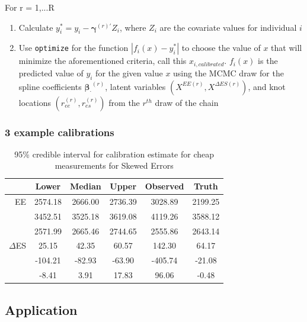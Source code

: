 \documentclass[handout]{beamer}\usepackage[]{graphicx}\usepackage[]{color}
\begin{document}
\begin{frame}

For r = 1,...R
\begin{enumerate}
\item
Calculate $y_i^* = y_i- \boldsymbol{\gamma}^{(r)'} Z_i$, where $Z_i$ are the covariate values for individual $i$
\item
Use \texttt{optimize} for the function $|f_i(x) - y_i^*|$ to choose the value of $x$ that will minimize the aforementioned criteria, call this $x_{i,calibrated}$. $f_i(x)$ is the predicted value of $y_i$ for the given value $x$ using the MCMC draw for the spline coefficients $\boldsymbol{\beta_{\cdot}}^{(r)}$, latent variables $({ X^{EE(r)},X^{\Delta ES (r)}})$, and knot locations $(r_{ee}^{(r)},r_{es}^{(r)})$ from the $r^{th}$ draw of the chain

\end{enumerate}


\end{frame}

\begin{frame}
\frametitle{3 example calibrations}

\begin{table}[ht]
\centering
\begin{tabular}{r|ccc|cc}
  \hline
& Lower & Median & Upper & Observed & Truth \\ 
  \hline
EE & 2574.18 & 2666.00 & 2736.39 & 3028.89 & 2199.25 \\ 
  & 3452.51 & 3525.18 & 3619.08 & 4119.26 & 3588.12 \\ 
  & 2571.99 & 2665.46 & 2744.65 & 2555.86 & 2643.14 \\ 
   \hline  
   $\Delta$ES & 25.15 & 42.35 & 60.57 & 142.30 & 64.17 \\ 
  & -104.21 & -82.93 & -63.90 & -405.74 & -21.08 \\ 
  & -8.41 & 3.91 & 17.83 & 96.06 & -0.48 \\ 
   \hline
\end{tabular}
\caption{95\% credible interval for calibration estimate for cheap measurements for Skewed Errors} 
\label{calibratedee}
\end{table}

\end{frame}

\subsection{Application}
\end{document}
